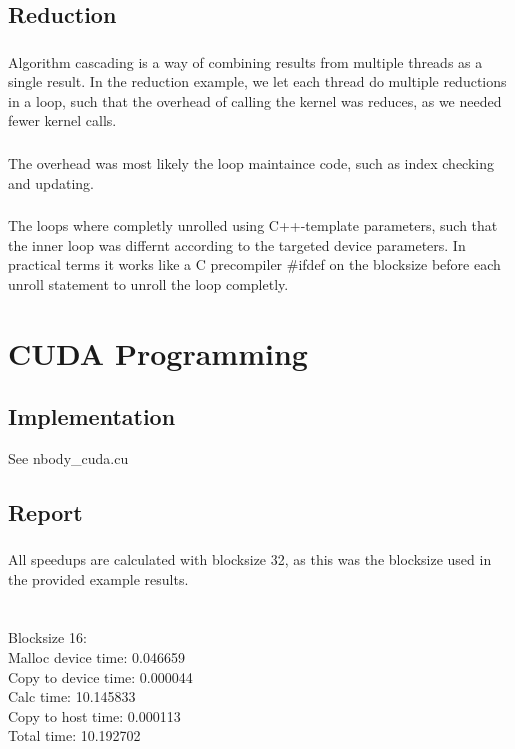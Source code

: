 \documentclass[english,a4paper,numbers=noenddot]{article}
\begin{document}
\subsection{Reduction}
\subsubsection{}
Algorithm cascading is a way of combining results from multiple threads as a single result.
In the reduction example, we let each thread do multiple reductions in a loop, such that the overhead of calling the kernel was reduces, as we needed fewer kernel calls.

\subsubsection{}
The overhead was most likely the loop maintaince code, such as index checking and updating.

\subsubsection{}
The loops where completly unrolled using C++-template parameters, such that the inner loop was differnt according to the targeted device parameters. In practical terms it works like a C precompiler {\ttfamily \#ifdef} on the blocksize before each unroll statement to unroll the loop completly.

\section{CUDA Programming}
\subsection{Implementation}
See {\ttfamily nbody\_cuda.cu}
\subsection{Report}
\subsubsection{}
All speedups are calculated with blocksize 32, as this was the blocksize used in the provided example results.

\begin{tabular}{l|lll}

\end{tabular}

\subsubsection{}
Blocksize 16:\\
Malloc device time: 0.046659\\
Copy to device time: 0.000044\\
Calc time: 10.145833\\
Copy to host time: 0.000113\\
Total time: 10.192702\\
\end{document}
